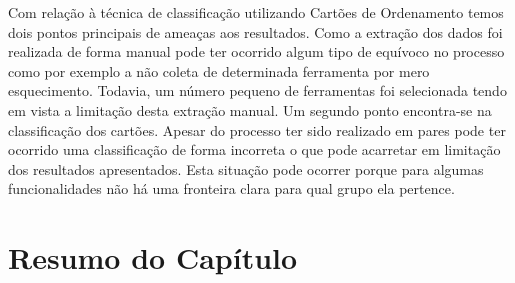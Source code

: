 Com relação à técnica de classificação utilizando Cartões de Ordenamento temos
dois pontos principais de ameaças aos resultados. Como a extração dos dados foi
realizada de forma manual pode ter ocorrido algum tipo de equívoco no processo
como por exemplo a  não coleta de determinada ferramenta por mero esquecimento.
Todavia, um número pequeno de ferramentas foi selecionada tendo em vista a
limitação desta extração manual. Um segundo ponto encontra-se na classificação
dos cartões. Apesar do processo ter sido realizado em pares pode ter ocorrido
uma classificação de forma incorreta o que pode acarretar em limitação dos
resultados apresentados. Esta situação pode ocorrer porque para algumas
funcionalidades não há uma fronteira clara para qual grupo ela pertence.

\section{Resumo do Capítulo}
\label{sec:resumo_do_capitulo}
